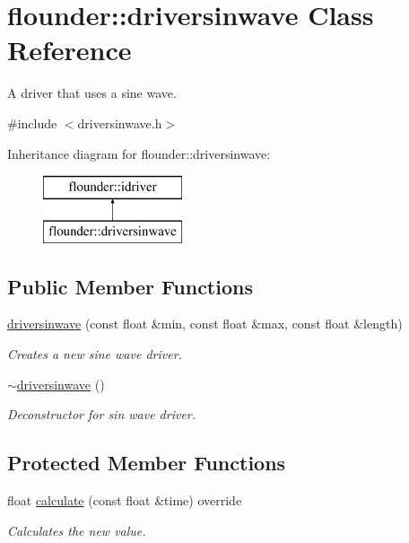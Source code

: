 \hypertarget{classflounder_1_1driversinwave}{}\section{flounder\+:\+:driversinwave Class Reference}
\label{classflounder_1_1driversinwave}


A driver that uses a sine wave.  




{\ttfamily \#include $<$driversinwave.\+h$>$}

Inheritance diagram for flounder\+:\+:driversinwave\+:\begin{figure}[H]
\begin{center}
\leavevmode
\includegraphics[height=2.000000cm]{classflounder_1_1driversinwave}
\end{center}
\end{figure}
\subsection*{Public Member Functions}
\begin{DoxyCompactItemize}
\item 
\hyperlink{classflounder_1_1driversinwave_ab076a8b6fbbb6a33e627c41a8978d5bc}{driversinwave} (const float \&min, const float \&max, const float \&length)
\begin{DoxyCompactList}\small\item\em Creates a new sine wave driver. \end{DoxyCompactList}\item 
\hyperlink{classflounder_1_1driversinwave_a6d4bc8b23f918d9f355d463fe8dee688}{$\sim$driversinwave} ()
\begin{DoxyCompactList}\small\item\em Deconstructor for sin wave driver. \end{DoxyCompactList}\end{DoxyCompactItemize}
\subsection*{Protected Member Functions}
\begin{DoxyCompactItemize}
\item 
float \hyperlink{classflounder_1_1driversinwave_ae5c3d8d4bd38082ad2b0396029d45e66}{calculate} (const float \&time) override
\begin{DoxyCompactList}\small\item\em Calculates the new value. \end{DoxyCompactList}\end{DoxyCompactItemize}

